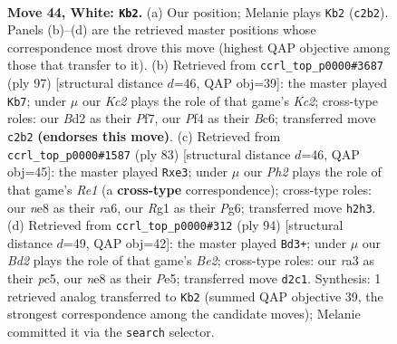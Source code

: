 \documentclass[11pt]{article}
\begin{document}
\clearpage

\begin{figure}[p]\centering
\begin{subfigure}{0.46\textwidth}\centering
\resizebox{\linewidth}{!}{%
\newchessgame
\chessboard[
  setfen={4n3/p1p5/2k2p1R/8/4rP1p/r7/2KB3P/5BR1 w - - 2 44},
  showmover=false,
  pgfstyle=straightmove, color=movearrow, markmove={c2-b2}
]}
\caption{}
\end{subfigure}\hfill
\begin{subfigure}{0.46\textwidth}\centering
\resizebox{\linewidth}{!}{%
\newchessgame
\chessboard[
  setfen={8/2k2pp1/R1b4p/P1p1P3/2P3P1/r6P/3NK3/8 b - - 11 49},
  showmover=false,
  pgfstyle=straightmove, color=movearrow, markmove={c7-b7}
]}
\caption{}
\end{subfigure}
\\[4pt]
\begin{subfigure}{0.46\textwidth}\centering
\resizebox{\linewidth}{!}{%
\newchessgame
\chessboard[
  setfen={4r1k1/5pb1/R5p1/8/6P1/2p1PP2/P1R1N1K1/r7 b - - 0 42},
  showmover=false,
  pgfstyle=straightmove, color=movearrow, markmove={e8-e3}
]}
\caption{}
\end{subfigure}\hfill
\begin{subfigure}{0.46\textwidth}\centering
\resizebox{\linewidth}{!}{%
\newchessgame
\chessboard[
  setfen={5R2/b1p2ppk/P3p3/2p1P3/5r2/5P2/3KB3/8 w - - 6 48},
  showmover=false,
  pgfstyle=straightmove, color=movearrow, markmove={e2-d3}
]}
\caption{}
\end{subfigure}
\caption{\textbf{Move 44, White: \texttt{Kb2}.} (a) Our position; Melanie plays \texttt{Kb2} (\texttt{c2b2}). Panels (b)--(d) are the retrieved master positions whose correspondence most drove this move (highest QAP objective among those that transfer to it). (b) Retrieved from \texttt{ccrl\_top\_p0000\#3687} (ply 97) [structural distance $d$=46, QAP obj=39]: the master played \texttt{Kb7}; under $\mu$ our \emph{Kc2} plays the role of that game's \emph{Kc2}; cross-type roles: our \emph{B}d2 as their \emph{P}f7, our \emph{P}f4 as their \emph{B}c6; transferred move \texttt{c2b2} \textbf{(endorses this move)}. (c) Retrieved from \texttt{ccrl\_top\_p0000\#1587} (ply 83) [structural distance $d$=46, QAP obj=45]: the master played \texttt{Rxe3}; under $\mu$ our \emph{Ph2} plays the role of that game's \emph{Re1} (a \textbf{cross-type} correspondence); cross-type roles: our \emph{n}e8 as their \emph{r}a6, our \emph{R}g1 as their \emph{P}g6; transferred move \texttt{h2h3}. (d) Retrieved from \texttt{ccrl\_top\_p0000\#312} (ply 94) [structural distance $d$=49, QAP obj=42]: the master played \texttt{Bd3+}; under $\mu$ our \emph{Bd2} plays the role of that game's \emph{Be2}; cross-type roles: our \emph{r}a3 as their \emph{p}c5, our \emph{n}e8 as their \emph{P}e5; transferred move \texttt{d2c1}. Synthesis: 1 retrieved analog transferred to \texttt{Kb2} (summed QAP objective 39, the strongest correspondence among the candidate moves); Melanie committed it via the \texttt{search} selector.}
\label{fig:thought-m86}
\end{figure}
\end{document}
